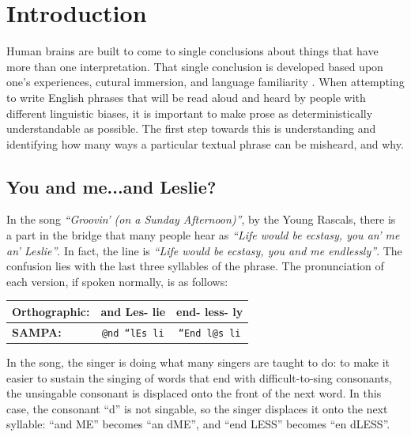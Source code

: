\chapter{Introduction}
\label{intro}

Human brains are built to come to single conclusions about things that have more than one interpretation.  That single conclusion is developed based upon one's experiences, cutural immersion, and language familiarity \cite{smith_music_2003}. When attempting to write English phrases that will be read aloud and heard by people with different linguistic biases, it is important to make prose as deterministically understandable as possible. The first step towards this is understanding and identifying how many ways a particular textual phrase can be misheard, and why.


\section{You and me...and Leslie?}
\label{sect:youAndMeAndLeslie}

In the song \textit{``Groovin' (on a Sunday Afternoon)''}, by the Young Rascals, there is a part in the bridge that many people hear as \textit{``Life would be ecstasy, you an' me an' Leslie''}. In fact, the line is \textit{``Life would be ecstasy, you and me endlessly''}. The confusion lies with the last three syllables of the phrase. The pronunciation of each version, if spoken normally, is as follows:



\begin{center}
    \begin{tabular}{|l|c|c|}
        \hline
        \textbf{Orthographic:} & and       Les-   lie & end-       less-       ly \\ 
        \hline
        \textbf{SAMPA:}      & \texttt{@nd   ``lEs     li}   & \texttt{``End      l@s       li}   \\
        \hline
    \end{tabular}
\label{table:groovinAlphaSAMPA}
\end{center}


In the song, the singer is doing what many singers are taught to do: to make it easier to sustain the singing of words that end with difficult-to-sing consonants, the unsingable consonant is displaced onto the front of the next word. In this case, the consonant ``d'' is not singable, so the singer displaces it onto the next syllable: ``and ME'' becomes ``an dME'', and ``end LESS'' becomes ``en dLESS''. 

